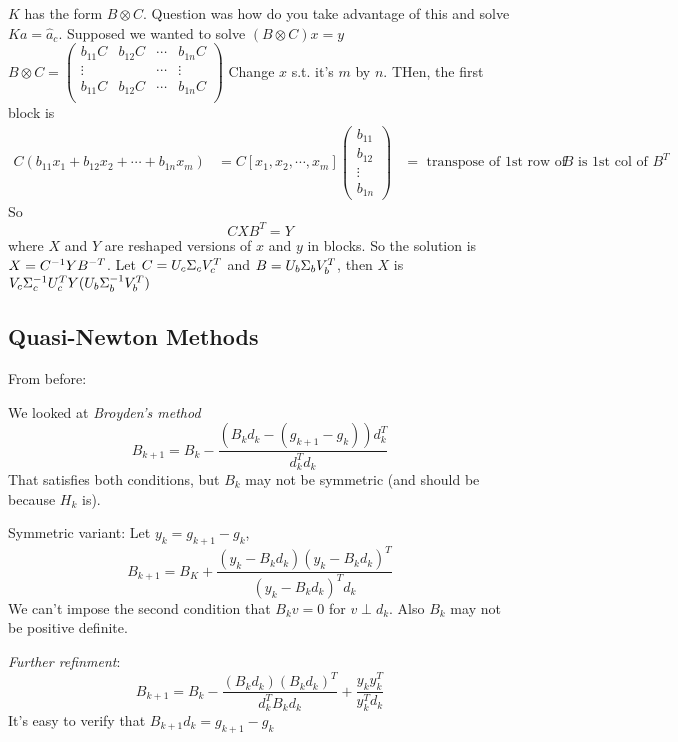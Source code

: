 $K$ has the form $B \otimes C$. Question was how do you take advantage
of this and solve $Ka = \hat a_c$.  Supposed we wanted to solve $(B
\otimes C)x = y$
$B \otimes C =
\begin{pmatrix}
  b_{11}C & b_{12}C & \cdots & b_{1n}C\\
  \vdots &  & \cdots & \vdots \\
  b_{11}C & b_{12}C & \cdots & b_{1n}C\\
\end{pmatrix}
$
Change $x$ s.t. it's $m$ by $n$.
THen, the first block is
\begin{align*}
C(b_{11}x_1 + b_{12}x_2 + \cdots + b_{1n}x_m)  &=C[x_1 , x_2, \cdots, x_m]
\begin{pmatrix}
  b_{11} \\ b_{12} \\ \vdots \\ b_{1n}
\end{pmatrix}
&= \text{ transpose of 1st row of $B$ is 1st col of $B^T$}
\end{align*}
So
$$CXB^T=Y$$ where $X$ and $Y$ are reshaped versions of $x$ and $y$ in
blocks.
So the solution is $X=C^{-1} Y B^{-T}$. Let $C= U_c\Sigma_cV_c^T$ and
$B=U_b\Sigma_bV_b^T$, then $X$ is $V_c\Sigma_c^{-1} U_c^TY(U_b\Sigma_b^{-1} V_b^T)$

\subsection{Quasi-Newton Methods}
\label{sec:quasi-newton}
From before:
\begin{algorithmic}
  \ENDFOR
\end{algorithmic}
 We looked at \emph{Broyden's method} $$B_{k+1} = B_k - \frac{(B_kd_k
   - (g_{k+1} - g_k))d_k^T}{d_k^Td_k}$$
That satisfies both conditions, but $B_k$ may not be symmetric (and
should be because $H_k$ is).

Symmetric variant: Let $y_k = g_{k+1} - g_k$, $$B_{k+1} = B_K +
\frac{(y_k-B_kd_k)(y_k-B_kd_k)^T}{(y_k-B_kd_k)^Td_k}$$
We can't impose the second condition that $B_kv = 0$ for $v\perp d_k$.
Also $B_k$ may not be positive definite.

\emph{Further refinment}: $$B_{k+1} = B_k -
\frac{(B_kd_k)(B_kd_k)^T}{d_k^TB_kd_k} + \frac{y_ky_k^T}{y_k^Td_k}$$
It's easy to verify that $B_{k+1}d_k = g_{k+1} - g_k$

